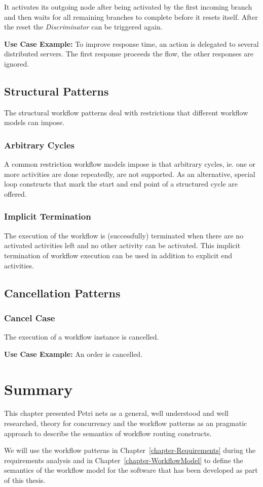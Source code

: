 It activates its outgoing node after being activated by the first incoming
branch and then waits for all remaining branches to complete before it resets
itself. After the reset the \emph{Discriminator} can be triggered again.

\textbf{Use Case Example:} To improve response time, an action is delegated to
several distributed servers. The first response proceeds the flow, the other
responses are ignored.

\subsection{Structural Patterns}
\label{subsection-StructuralPatterns}

The structural workflow patterns deal with restrictions that different workflow
models can impose.

\subsubsection{Arbitrary Cycles}

A common restriction workflow models impose is that arbitrary cycles, ie. one
or more activities are done repeatedly, are not supported. As an alternative,
special loop constructs that mark the start and end point of a structured cycle
are offered.

\subsubsection{Implicit Termination}

The execution of the workflow is (successfully) terminated when there are no
activated activities left and no other activity can be activated. This implicit
termination of workflow execution can be used in addition to explicit end
activities.

\subsection{Cancellation Patterns}
\label{subsection-CancellationPatterns}

\subsubsection{Cancel Case}

The execution of a workflow instance is cancelled.

\textbf{Use Case Example:} An order is cancelled.

\section{Summary}

This chapter presented Petri nets as a general, well understood and well
researched, theory for concurrency and the workflow patterns as an pragmatic
approach to describe the semantics of workflow routing constructs.

We will use the workflow patterns in Chapter~\ref{chapter-Requirements} during
the requirements analysis and in Chapter~\ref{chapter-WorkflowModel} to define
the semantics of the workflow model for the software that has been developed as
part of this thesis.
